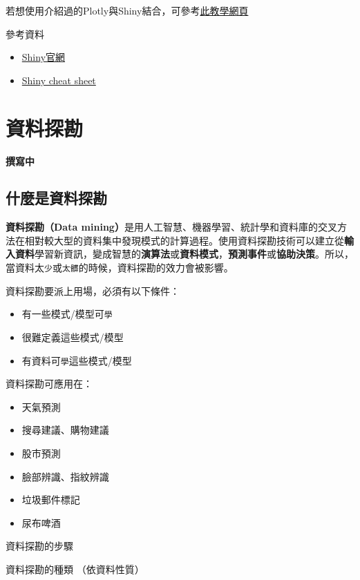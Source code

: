 \documentclass[]{book}
\providecommand{\tightlist}{%
  \setlength{\itemsep}{0pt}\setlength{\parskip}{0pt}}
\theoremstyle{definition}
\theoremstyle{definition}
\theoremstyle{remark}
\begin{document}
若想使用介紹過的Plotly與Shiny結合，可參考\href{https://plot.ly/r/shiny-tutorial/}{此教學網頁}

參考資料

\begin{itemize}
\tightlist
\item
  \href{http://shiny.rstudio.com/}{Shiny官網}
\item
  \href{https://www.rstudio.com/wp-content/uploads/2016/01/shiny-cheatsheet.pdf}{Shiny
  cheat sheet}
\end{itemize}

\chapter{資料探勘}\label{datamining}

\textbf{撰寫中}

\section{什麼是資料探勘}

\textbf{資料探勘（Data
mining）}是用人工智慧、機器學習、統計學和資料庫的交叉方法在相對較大型的資料集中發現模式的計算過程。使用資料探勘技術可以建立從\textbf{輸入資料}學習新資訊，變成智慧的\textbf{演算法}或\textbf{資料模式}，\textbf{預測事件}或\textbf{協助決策}。所以，當資料太\texttt{少}或\texttt{太髒}的時候，資料探勘的效力會被影響。

資料探勘要派上用場，必須有以下條件：

\begin{itemize}
\tightlist
\item
  有一些模式/模型可\texttt{學}
\item
  很難定義這些模式/模型
\item
  有資料可\texttt{學}這些模式/模型
\end{itemize}

資料探勘可應用在：

\begin{itemize}
\tightlist
\item
  天氣預測
\item
  搜尋建議、購物建議
\item
  股市預測
\item
  臉部辨識、指紋辨識
\item
  垃圾郵件標記
\item
  尿布啤酒
\end{itemize}

資料探勘的步驟

資料探勘的種類 （依資料性質）
\end{document}
